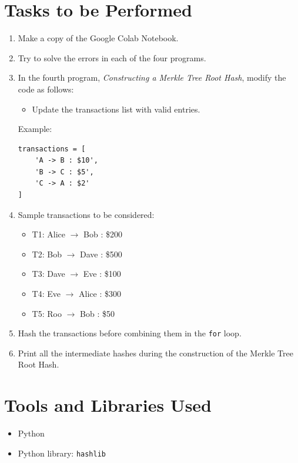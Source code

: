 \documentclass[12pt,a4paper]{article}
\begin{document}
\section{Tasks to be Performed}
\begin{enumerate}[label=\arabic*., leftmargin=*]
    \item Make a copy of the Google Colab Notebook.
    \item Try to solve the errors in each of the four programs.
    \item In the fourth program, \textit{Constructing a Merkle Tree Root Hash}, modify the code as follows:
    \begin{itemize}[leftmargin=1.5em]
        \item Update the transactions list with valid entries.
    \end{itemize}

    Example:
\begin{lstlisting}[style=pythonstyle]
transactions = [
    'A -> B : $10',
    'B -> C : $5',
    'C -> A : $2'
]
\end{lstlisting}

    \item Sample transactions to be considered:
    \begin{itemize}[leftmargin=1.5em]
        \item T1: Alice $\rightarrow$ Bob : \$200
        \item T2: Bob $\rightarrow$ Dave : \$500
        \item T3: Dave $\rightarrow$ Eve : \$100
        \item T4: Eve $\rightarrow$ Alice : \$300
        \item T5: Roo $\rightarrow$ Bob : \$50
    \end{itemize}

    \item Hash the transactions before combining them in the \texttt{for} loop.
    \item Print all the intermediate hashes during the construction of the Merkle Tree Root Hash.
\end{enumerate}

\section{Tools and Libraries Used}
\begin{itemize}
    \item Python
    \item Python library: \texttt{hashlib}
\end{itemize}
\end{document}
